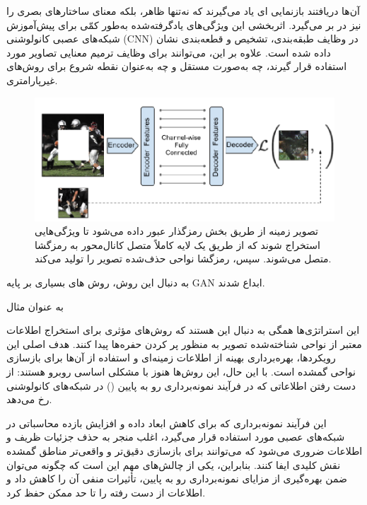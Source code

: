 آن‌ها دریافتند   بازنمایی ای یاد می‌گیرند که نه‌تنها ظاهر، بلکه معنای ساختارهای بصری را نیز در بر می‌گیرد. اثربخشی این ویژگی‌های یادگرفته‌شده به‌طور کمّی برای پیش‌آموزش شبکه‌های عصبی کانولوشنی (CNN) در وظایف طبقه‌بندی، تشخیص و قطعه‌بندی نشان داده شده است. علاوه بر این،  می‌توانند برای وظایف ترمیم معنایی تصاویر  مورد استفاده قرار گیرند، چه به‌صورت مستقل و چه به‌عنوان نقطه شروع برای روش‌های غیرپارامتری.
\begin{figure}
	\centering
	\includegraphics[width=0.7\linewidth]{figs/contextencodersArchitecture}
	\caption[معماری کلی Context Encoders]{
	تصویر زمینه از طریق بخش رمزگذار عبور داده می‌شود تا ویژگی‌هایی استخراج شوند که از طریق یک لایه کاملاً متصل کانال‌محور به رمزگشا متصل می‌شوند. سپس، رمزگشا نواحی حذف‌شده تصویر را تولید می‌کند.}
	\label{fig:contextencodersarchitecture}
\end{figure}

به دنبال این روش، روش های بسیاری بر پایه GAN ابداع شدند. 
\cite{caoLearningSketchTensor2021}
\cite{guoImageInpaintingConditional2024}
\cite{liRecurrentFeatureReasoning2020}
\cite{nazeriEdgeConnectGenerativeImage2019}
\cite{pengGeneratingDiverseStructure2021}

به عنوان مثال

این استراتژی‌ها همگی به دنبال این هستند که روش‌های مؤثری برای استخراج اطلاعات معتبر از نواحی شناخته‌شده تصویر به منظور پر کردن حفره‌ها پیدا کنند. هدف اصلی این رویکردها، بهره‌برداری بهینه از اطلاعات زمینه‌ای و استفاده از آن‌ها برای بازسازی نواحی گمشده است. با این حال، این روش‌ها هنوز با مشکلی اساسی روبرو هستند: از دست رفتن اطلاعاتی که در فرآیند نمونه‌برداری رو به پایین () در شبکه‌های کانولوشنی رخ می‌دهد.  

این فرآیند نمونه‌برداری که برای کاهش ابعاد داده و افزایش بازده محاسباتی در شبکه‌های عصبی مورد استفاده قرار می‌گیرد، اغلب منجر به حذف جزئیات ظریف و اطلاعات ضروری می‌شود که می‌توانند برای بازسازی دقیق‌تر و واقعی‌تر مناطق گمشده نقش کلیدی ایفا کنند. بنابراین، یکی از چالش‌های مهم این است که چگونه می‌توان ضمن بهره‌گیری از مزایای نمونه‌برداری رو به پایین، تأثیرات منفی آن را کاهش داد و اطلاعات از دست رفته را تا حد ممکن حفظ کرد.